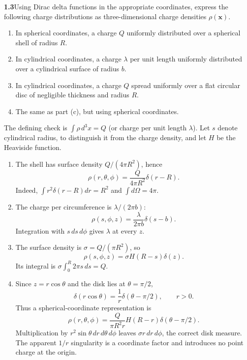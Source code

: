 \par\bigskip
\noindent\textbf{1.3}\quad Using Dirac delta functions in the appropriate coordinates, express the following charge distributions as three-dimensional charge densities $\rho(\mathbf{x})$.
\begin{enumerate}
\item[(a)] In spherical coordinates, a charge $Q$ uniformly distributed over a spherical shell of radius $R$.
\item[(b)] In cylindrical coordinates, a charge $\lambda$ per unit length uniformly distributed over a cylindrical surface of radius $b$.
\item[(c)] In cylindrical coordinates, a charge $Q$ spread uniformly over a flat circular disc of negligible thickness and radius $R$.
\item[(d)] The same as part (c), but using spherical coordinates.
\end{enumerate}
\solution
The defining check is $\int\rho\,d^3x=Q$ (or charge per unit length $\lambda$).
Let $s$ denote cylindrical radius, to distinguish it from the charge density,
and let $H$ be the Heaviside function.
\begin{enumerate}
\item[(a)] The shell has surface density $Q/(4\pi R^2)$, hence
\[
\boxed{\rho(r,\theta,\phi)=\frac{Q}{4\pi R^2}\delta(r-R).}
\]
Indeed, $\int r^2\delta(r-R)dr=R^2$ and $\int d\Omega=4\pi$.
\item[(b)] The charge per circumference is $\lambda/(2\pi b)$:
\[
\boxed{\rho(s,\phi,z)=\frac{\lambda}{2\pi b}\delta(s-b).}
\]
Integration with $s\,ds\,d\phi$ gives $\lambda$ at every $z$.
\item[(c)] The surface density is $\sigma=Q/(\pi R^2)$, so
\[
\boxed{\rho(s,\phi,z)=\sigma H(R-s)\delta(z).}
\]
Its integral is $\sigma\int_0^R2\pi s\,ds=Q$.
\item[(d)] Since $z=r\cos\theta$ and the disk lies at $\theta=\pi/2$,
\[
\delta(r\cos\theta)=\frac1r\delta(\theta-\pi/2),\qquad r>0.
\]
Thus a spherical-coordinate representation is
\[
\boxed{\rho(r,\theta,\phi)=\frac{Q}{\pi R^2r}
H(R-r)\delta(\theta-\pi/2).}
\]
Multiplication by $r^2\sin\theta\,dr\,d\theta\,d\phi$ leaves
$\sigma r\,dr\,d\phi$, the correct disk measure. The apparent $1/r$
singularity is a coordinate factor and introduces no point charge at the origin.
\end{enumerate}


